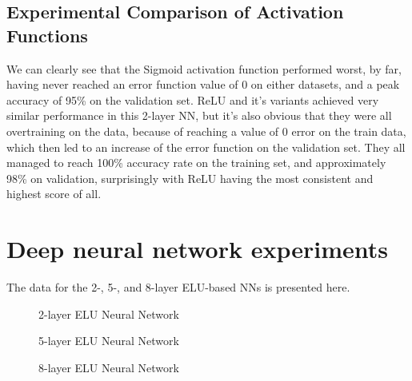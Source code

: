 \documentclass{article}
\begin{document}
\subsection{Experimental Comparison of Activation Functions}
We can clearly see that the Sigmoid activation function performed worst, by far, having never reached an error function value of 0 on either datasets, and a peak accuracy of 95\% on the validation set. ReLU and it's variants achieved very similar performance in this 2-layer NN, but it's also obvious that they were all overtraining on the data, because of reaching a value of 0 error on the train data, which then led to an increase of the error function on the validation set. They all managed to reach 100\% accuracy rate on the training set, and approximately 98\% on validation, surprisingly with ReLU having the most consistent and highest score of all.

\section{Deep neural network experiments}\label{sec:dnnexpts}
The data for the 2-, 5-, and 8-layer ELU-based NNs is presented here.
\begin{figure}[H]
    \centering
    \begin{subfigure}{}
      
    \end{subfigure}
    \begin{subfigure}{}
      
    \end{subfigure}
    \caption{2-layer ELU Neural Network}
\end{figure}

\begin{figure}[H]
    \centering
    \begin{subfigure}{}
      
    \end{subfigure}
    \begin{subfigure}{}
      
    \end{subfigure}
    \caption{5-layer ELU Neural Network}
\end{figure}

\begin{figure}[H]
    \centering
    \begin{subfigure}{}
      
    \end{subfigure}
    \begin{subfigure}{}
      
    \end{subfigure}
    \caption{8-layer ELU Neural Network}
\end{figure}
\end{document}
